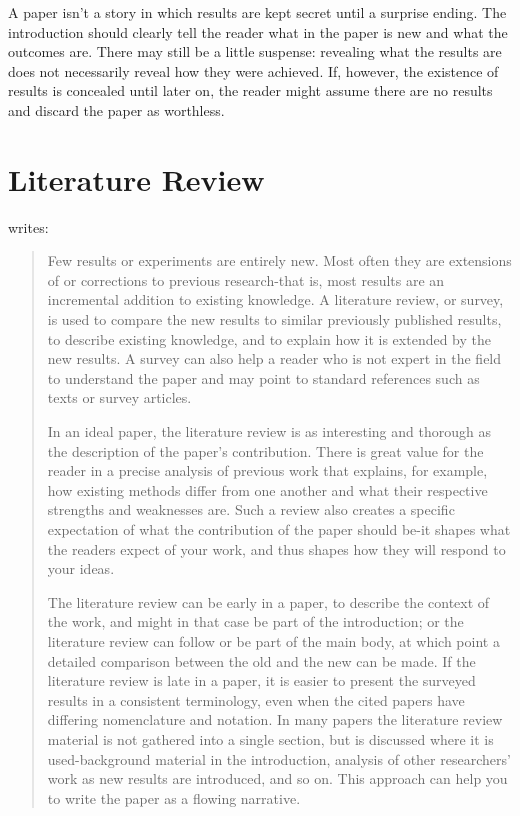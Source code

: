 \documentclass[a4paper,oneside,bibliography=totoc]{scrbook}
\begin{document}
{  A paper isn't a story in which results are kept secret until a surprise
  ending. The introduction should clearly tell the reader what in the paper is
  new and what the outcomes are. There may still be a little suspense: revealing
  what the results are does not necessarily reveal how they were achieved. If,
  however, the existence of results is concealed until later on, the reader
  might assume there are no results and discard the paper as worthless.}

\chapter{Literature Review}
\label{ch:related_work}

\citet{zobel2004} writes:

\blockcquote{zobel2004}{%
  Few results or experiments are entirely new. Most often they are extensions of
  or corrections to previous research-that is, most results are an incremental
  addition to existing knowledge. A literature review, or survey, is used to
  compare the new results to similar previously published results, to describe
  existing knowledge, and to explain how it is extended by the new results. A
  survey can also help a reader who is not expert in the field to understand the
  paper and may point to standard references such as texts or survey articles.

  In an ideal paper, the literature review is as interesting and thorough as the
  description of the paper's contribution. There is great value for the reader
  in a precise analysis of previous work that explains, for example, how
  existing methods differ from one another and what their respective strengths
  and weaknesses are. Such a review also creates a specific expectation of what
  the contribution of the paper should be-it shapes what the readers expect of
  your work, and thus shapes how they will respond to your ideas.

  The literature review can be early in a paper, to describe the context of the
  work, and might in that case be part of the introduction; or the literature
  review can follow or be part of the main body, at which point a detailed
  comparison between the old and the new can be made. If the literature review
  is late in a paper, it is easier to present the surveyed results in a
  consistent terminology, even when the cited papers have differing nomenclature
  and notation. In many papers the literature review material is not gathered
  into a single section, but is discussed where it is used-background material
  in the introduction, analysis of other researchers' work as new results are
  introduced, and so on. This approach can help you to write the paper as a
  flowing narrative.

}
\end{document}

